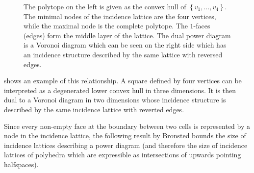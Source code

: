 \begin{figure}[tb]
    \caption{The polytope on the left is given as the convex hull of $\left\{ v_1, \dots, v_4 \right\}$.
    The minimal nodes of the incidence lattice are the four vertices, while the maximal node is the complete polytope. The $1$-faces (edges) form the middle layer of the lattice.
    The dual power diagram is a Voronoi diagram which can be seen on the right side which has an incidence structure described by the same lattice with reversed edges.}
    \label{fig:incidencelattice}
\end{figure}
 shows an example of this relationship.
A square defined by four vertices can be interpreted as a degenerated lower convex hull in three dimensions. It is then dual to a Voronoi diagram in two dimensions whose incidence structure is described by the same incidence lattice with reverted edges.

Since every non-empty face at the boundary between two cells is represented by a node in the incidence lattice, the following result by Bronsted \cite{brondsted2012introduction} bounds the size of incidence lattices describing a power diagram (and therefore the size of incidence lattices of polyhedra which are expressible as intersections of upwards pointing halfspaces).

